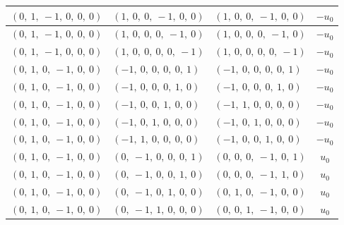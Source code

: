 \documentclass[11pt]{article}
\theoremstyle{definition}
\begin{document}
\begin{longtable}{|l|l|l|c|}
    \hline
    $\left( 0, \  1, \  -1, \  0, \  0, \  0\right)$ & $\left( 1, \  0, \  0, \  -1, \  0, \  0\right)$ & $\left( 1, \  0, \  0, \  -1, \  0, \  0\right)$ & $- u_{0}$ \\
    \hline
    $\left( 0, \  1, \  -1, \  0, \  0, \  0\right)$ & $\left( 1, \  0, \  0, \  0, \  -1, \  0\right)$ & $\left( 1, \  0, \  0, \  0, \  -1, \  0\right)$ & $- u_{0}$ \\
    \hline
    $\left( 0, \  1, \  -1, \  0, \  0, \  0\right)$ & $\left( 1, \  0, \  0, \  0, \  0, \  -1\right)$ & $\left( 1, \  0, \  0, \  0, \  0, \  -1\right)$ & $- u_{0}$ \\
    \hline
    $\left( 0, \  1, \  0, \  -1, \  0, \  0\right)$ & $\left( -1, \  0, \  0, \  0, \  0, \  1\right)$ & $\left( -1, \  0, \  0, \  0, \  0, \  1\right)$ & $- u_{0}$ \\
    \hline
    $\left( 0, \  1, \  0, \  -1, \  0, \  0\right)$ & $\left( -1, \  0, \  0, \  0, \  1, \  0\right)$ & $\left( -1, \  0, \  0, \  0, \  1, \  0\right)$ & $- u_{0}$ \\
    \hline
    $\left( 0, \  1, \  0, \  -1, \  0, \  0\right)$ & $\left( -1, \  0, \  0, \  1, \  0, \  0\right)$ & $\left( -1, \  1, \  0, \  0, \  0, \  0\right)$ & $- u_{0}$ \\
    \hline
    $\left( 0, \  1, \  0, \  -1, \  0, \  0\right)$ & $\left( -1, \  0, \  1, \  0, \  0, \  0\right)$ & $\left( -1, \  0, \  1, \  0, \  0, \  0\right)$ & $- u_{0}$ \\
    \hline
    $\left( 0, \  1, \  0, \  -1, \  0, \  0\right)$ & $\left( -1, \  1, \  0, \  0, \  0, \  0\right)$ & $\left( -1, \  0, \  0, \  1, \  0, \  0\right)$ & $- u_{0}$ \\
    \hline
    $\left( 0, \  1, \  0, \  -1, \  0, \  0\right)$ & $\left( 0, \  -1, \  0, \  0, \  0, \  1\right)$ & $\left( 0, \  0, \  0, \  -1, \  0, \  1\right)$ & $u_{0}$ \\
    \hline
    $\left( 0, \  1, \  0, \  -1, \  0, \  0\right)$ & $\left( 0, \  -1, \  0, \  0, \  1, \  0\right)$ & $\left( 0, \  0, \  0, \  -1, \  1, \  0\right)$ & $u_{0}$ \\
    \hline
    $\left( 0, \  1, \  0, \  -1, \  0, \  0\right)$ & $\left( 0, \  -1, \  0, \  1, \  0, \  0\right)$ & $\left( 0, \  1, \  0, \  -1, \  0, \  0\right)$ & $u_{0}$ \\
    \hline
    $\left( 0, \  1, \  0, \  -1, \  0, \  0\right)$ & $\left( 0, \  -1, \  1, \  0, \  0, \  0\right)$ & $\left( 0, \  0, \  1, \  -1, \  0, \  0\right)$ & $u_{0}$ \\

\end{longtable}
\end{document}

